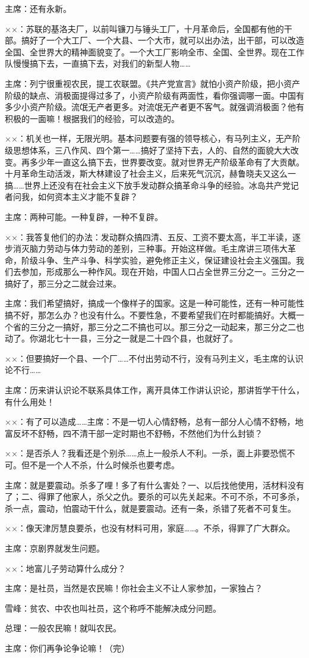 主席：还有永新。

××：苏联的基洛夫厂，以前叫镰刀与锤头工厂，十月革命后，全国都有他的干部。搞好了一个大工厂、一个大县、一个大市，就可以出办法，出干部，可以改造全国、全世界大的精神面貌变了。一个大工厂影响全市、全国、全世界。现在工作队慢慢搞下去，一直搞下去，对我们的新型人物……

主席：列宁很重视农民，提工农联盟。《共产党宣言》就怕小资产阶级，把小资产阶级的缺点、消极面提得过多了，小资产阶级有两面性，看你强调哪一面。中国有多少小资产阶级。流氓无产者更多。对流氓无产者更不客气。就强调消极面？他有积极的一面嘛！根据我们的经验，可以改造的。

××：机关也一样，无限光明。基本问题要有强的领导核心，有马列主义，无产阶级思想体系，三八作风、四个第一……搞好了坚持下去，人的、自然的面貌大大改变。再多少年一直这么搞下去，世界要改变。就对世界无产阶级革命有了大贡献。十月革命生动活泼，斯大林建设了社会主义，后来死气沉沉，赫鲁晓夫又这么一搞……世界上还没有在社会主义下放手发动群众搞革命斗争的经验。冰岛共产党记者问我，如何资本主义才能不复辟？

主席：两种可能。一种复辟，一种不复辟。

××：我答复他们的办法：发动群众搞四清、五反、工资不要太高，半工半读，逐步消灭脑力劳动与体力劳动的差别，三种事。开始这样做。毛主席讲三项伟大革命，阶级斗争、生产斗争、科学实验，避免修正主义，保证建设社会主义强国。我们去参加，形成那么一种作风。现在开始，中国人口占全世界三分之一。三分之一搞好了，那三分之二就会过来。

主席：我们希望搞好，搞成一个像样子的国家。这是一种可能性，还有一种可能性搞不好，那怎么办？也没有什么。不要性急，不要希望我们在时都能搞好。大概一个省的三分之一搞好，那三分之二不搞也可以。那三分之一动起来，那三分之二也动了。你湖北七十一县，三分之一就是二十四个县，也就好了。

××：但要搞好一个县、一个厂……不付出劳动不行，没有马列主义，毛主席的认识论不行……

主席：历来讲认识论不联系具体工作，离开具体工作讲认识论，那讲哲学干什么，有什么用处！

××：有了可以造成……主席：不是一切人心情舒畅，总有一部分人心情不舒畅，地富反坏不舒畅，四不清干部一定时期也不舒畅，不然他们为什么封锁？

××：是否杀人？我看还是个别杀……点上一般杀人不利。一杀，面上非要恐慌不可。但不是一个人不杀，什么时候杀也要考虑。

主席：就是要震动。杀多了哩！多了有什么害处？一、以后找他使用，活材料没有了；二、得罪了他家人，杀父之仇。要杀的可以先关起来。不可不杀，不可多杀，杀一点，震动，怕震动干什么，就是要震动。还有一条，杀错了死者不可复生。

××：像天津厉慧良要杀，也没有材料可用，家庭……。不杀，得罪了广大群众。

主席：京剧界就发生问题。

××：地富儿子劳动算什么成分？

主席：是社员，当然是农民嘛！你社会主义不让人家参加，一家独占？

雪峰：贫农、中农也叫社员，这个称呼不能解决成分问题。

总理：一般农民嘛！就叫农民。

主席：你们再争论争论嘛！（完）


